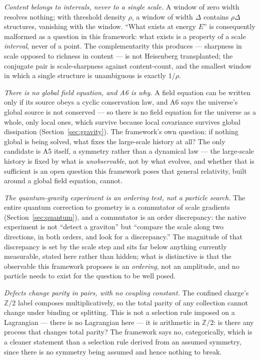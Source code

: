 \documentclass[pdflatex,sn-mathphys-num]{sn-jnl}
\theoremstyle{thmstyleone}
\theoremstyle{thmstylethree}
\theoremstyle{thmstyletwo}
\begin{document}
\emph{Content belongs to intervals, never to a single scale.} A window
of zero width resolves nothing; with threshold density $\rho$, a window
of width $\Delta$ contains $\rho\Delta$ structures, vanishing with the
window. ``What exists at energy $E$'' is consequently malformed as a
question in this framework: what exists is a property of a scale
\emph{interval}, never of a point. The complementarity this produces —
sharpness in scale opposed to richness in content — is not Heisenberg
transplanted; the conjugate pair is scale-sharpness against
content-count, and the smallest window in which a single structure is
unambiguous is exactly $1/\rho$.

\emph{There is no global field equation, and A6 is why.} A field
equation can be written only if its source obeys a cyclic conservation
law, and A6 says the universe's global source is not conserved — so
there is no field equation for the universe as a whole, only local ones,
which survive because local covariance survives global dissipation
(Section~\ref{sec:gravity}). The framework's own question: if nothing
global is being solved, what fixes the large-scale history at all? The
only candidate is A5 itself, a symmetry rather than a dynamical law —
the large-scale history is fixed by what is \emph{unobservable}, not by
what evolves, and whether that is sufficient is an open question this
framework poses that general relativity, built around a global field
equation, cannot.

\emph{The quantum-gravity experiment is an ordering test, not a
particle search.} The entire quantum correction to geometry is a
commutator of scale gradients (Section~\ref{sec:quantum}), and a
commutator is an order discrepancy: the native experiment is not
``detect a graviton'' but ``compare the scale along two directions, in
both orders, and look for a discrepancy.'' The magnitude of that
discrepancy is set by the scale step and sits far below anything
currently measurable, stated here rather than hidden; what is
distinctive is that the observable this framework proposes is an
\emph{ordering}, not an amplitude, and no particle needs to exist for
the question to be well posed.

\emph{Defects change parity in pairs, with no coupling constant.} The
confined charge's $\mathbb{Z}/2$ label composes multiplicatively, so the
total parity of any collection cannot change under binding or splitting.
This is not a selection rule imposed on a Lagrangian — there is no
Lagrangian here — it is arithmetic in $\mathbb{Z}/2$: is there any
process that changes total parity? The framework says no, categorically,
which is a cleaner statement than a selection rule derived from an
assumed symmetry, since there is no symmetry being assumed and hence
nothing to break.
\end{document}
